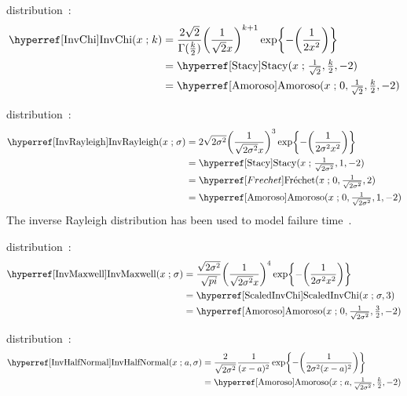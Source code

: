  distribution~\cite{Lee2012}: 
\begin{align}
\label{InvChi}
\opr{InvChi}(x \given k) 
&= \frac{2\sqrt{2} }{ \Gamma(\tfrac{k}{2})} { \Left(\frac{1}{\sqrt{2} x}\Right)}^{k+1} \exp\Left\{-\Left(\frac{1}{2 x^2}  \Right)\Right\}
\checked
\\
&=  \opr{Stacy}(x\given  \tfrac{1}{\sqrt{2}}, \tfrac{k}{2}, -2)  \notag \checked \\
&=  \opr{Amoroso}(x\given  0, \tfrac{1}{\sqrt{2}} , \tfrac{k}{2}, -2) \notag  \checked
\end{align}



 distribution~\cite{Evans2000}:
\begin{align}
\label{InvRayleigh}
\opr{InvRayleigh}(x \given \sigma) 
&= 2 \sqrt{2 \sigma ^2}    \Left(\frac{1}{\sqrt{2 \sigma^2} x}\Right)^{3} \exp\Left\{-\Left(\frac{1}{2 \sigma^2 x^2}  \Right)\Right\}
\checked
\\
&=  \opr{Stacy}(x\given \tfrac{1}{\sqrt{2 \sigma^2}}, 1, -2)  \notag \checked \\
& = \Frechet(x\given 0, \tfrac{1}{\sqrt{2 \sigma^2}}, 2)\notag \\
&=  \opr{Amoroso}(x\given  0, \tfrac{1}{\sqrt{2 \sigma^2}}, 1, -2)  \checked \notag 
\end{align}
The inverse Rayleigh distribution has been used to model failure time~\cite{Voda1972}.



 distribution~\cite{Shakil2010}:
%
\begin{align}
\label{InvMaxwell}
\opr{InvMaxwell}(x \given \sigma) 
&= \frac{\sqrt{2 \sigma ^2} }{ \sqrt{pi}} { \Left(\frac{1}{\sqrt{2 \sigma^2} x}\Right)}^{4} \exp\Left\{-\Left(\frac{1}{2 \sigma^2 x^2}  \Right)\Right\} 
\\
&= \opr{ScaledInvChi}(x \given \sigma, 3) \checked \notag \\
&= \opr{Amoroso}(x\given  0, \tfrac{1}{\sqrt{2 \sigma^2}}, \tfrac{3}{2}, -2) \notag  \checked
\end{align}



 distribution~\cite{Shakil2010}:
%
\begin{align}
\label{InvHalfNormal}
\opr{InvHalfNormal}(x \given a, \sigma)
&= \frac{2}{\sqrt{2 \sigma ^2}}   \frac{1}{(x-a)^2} \exp\Left\{-\Left(\frac{1}{2 \sigma^2 (x-a)^2}  \Right)\Right\} 
\\
&=  \opr{Amoroso}(x\given  a, \tfrac{1}{\sqrt{2 \sigma^2}}, \tfrac{k}{2}, -2) \notag  \checked
\end{align}



